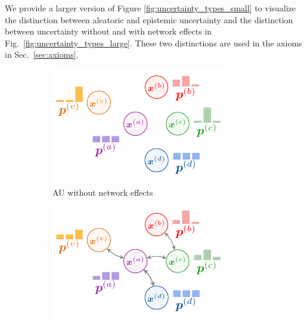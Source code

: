 We provide a larger version of Figure \ref{fig:uncertainty_types_small} to visualize the distinction between aleatoric and epistemic uncertainty and the distinction between uncertainty without and with network effects in Fig.~\ref{fig:uncertainty_types_large}. These two distinctions are used in the axioms in Sec.~\ref{sec:axioms}.

\begin{figure}[!h]
\centering
	\begin{subfigure}[t]{0.495\textwidth}
	    \centering
		\includegraphics[width=\textwidth]{sections/009_neurips2021/resources/no-network-aleatoric.pdf}
		\caption{AU without network effects} 
		\label{subfig:au_without_network_large}
	\end{subfigure}
	\begin{subfigure}[t]{0.495\textwidth}
	    \centering
		\includegraphics[width=\textwidth]{sections/009_neurips2021/resources/network-aleatoric.pdf}

\end{subfigure}
\end{figure}

